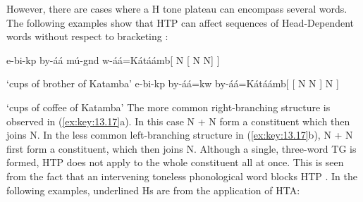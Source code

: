 \documentclass[output=paper]{langsci/langscibook}
\begin{document}
However, there are cases where a H tone plateau can encompass several words.
The following examples show that \gls{HTP} can affect sequences of Head-Dependent
words without respect to bracketing \citep[159]{Hyman1988}:

\ea\label{ex:key:13.17}
    \ea e-bi-kp  by-áá  mú-gnd
    w-áá=Kátáámb\hfill[ N [ N N] ]
    \\\vspace{1\baselineskip}
        ‘cups of brother of Katamba’
        \ex e-bi-kp  by-áá=kw by-áá=Kátáámb\hfill[ [ N N ] N ]\\\vspace{1\baselineskip}
        ‘cups of coffee of Katamba’
    \z
\z
The more common right-branching structure is observed in (\ref{ex:key:13.17}a). In
this case N + N form a constituent which then joins N. In
the less common left-branching structure in (\ref{ex:key:13.17}b), N +
N first form a constituent, which then joins N. Although a
single, three-word \gls{TG} is formed, \gls{HTP} does not apply to the whole
constituent all at once. This is seen from the fact that an intervening
toneless phonological word blocks \gls{HTP} \citep[157]{Hyman1988}. In the
following examples, underlined Hs are from the application of \gls{HTA}:
\end{document}
